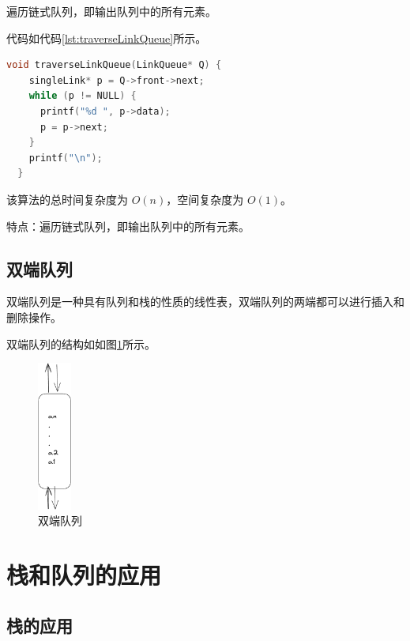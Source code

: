 \documentclass[lang=cn,newtx,10pt,scheme=chinese]{../elegantbook}
\begin{document}
遍历链式队列，即输出队列中的所有元素。

代码如代码\ref{lst:traverseLinkQueue}所示。

\begin{lstlisting}[language=C++, caption={遍历队列示例代码}, label={lst:traverseLinkQueue}]
  void traverseLinkQueue(LinkQueue* Q) {
    singleLink* p = Q->front->next;
    while (p != NULL) {
      printf("%d ", p->data);
      p = p->next;
    }
    printf("\n");
  }

\end{lstlisting}

该算法的总时间复杂度为 $O(n)$，空间复杂度为 $O(1)$。

特点：遍历链式队列，即输出队列中的所有元素。





\subsection{双端队列}

双端队列是一种具有队列和栈的性质的线性表，双端队列的两端都可以进行插入和删除操作。

双端队列的结构如如图\ref{fig:deque}所示。

\begin{figure}[!htbp]
  \centering
  \includegraphics[width=0.1\textwidth]{./figure/pdf/cropped/DQueue.pdf}
  \caption{双端队列}
  \label{fig:deque}
\end{figure}


\section{栈和队列的应用}

\subsection{栈的应用}
\end{document}
